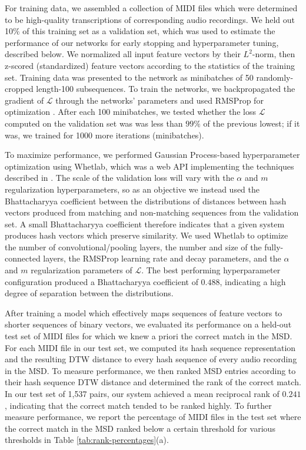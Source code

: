 \documentclass{article} %
\begin{document}
For training data, we assembled a collection of MIDI files which were determined to be high-quality transcriptions of corresponding audio recordings.
We held out 10\% of this training set as a validation set, which was used to estimate the performance of our networks for early stopping and hyperparameter tuning, described below.
We normalized all input feature vectors by their $L^2$-norm, then z-scored (standardized) feature vectors according to the statistics of the training set.
Training data was presented to the network as minibatches of 50 randomly-cropped length-100 subsequences.
To train the networks, we backpropagated the gradient of $\mathcal{L}$ through the networks' parameters and used RMSProp for optimization \cite{tieleman2012lecture}.
After each 100 minibatches, we tested whether the loss $\mathcal{L}$ computed on the validation set was was less than $99\%$ of the previous lowest; if it was, we trained for 1000 more iterations (minibatches).

To maximize performance, we performed Gaussian Process-based hyperparameter optimization using Whetlab, which was a web API implementing the techniques described in \cite{snoek2012practical}.
The scale of the validation loss will vary with the $\alpha$ and $m$ regularization hyperparameters, so as an objective we instead used the Bhattacharyya coefficient between the distributions of distances between hash vectors produced from matching and non-matching sequences from the validation set.
A small Bhattacharyya coefficient therefore indicates that a given system produces hash vectors which preserve similarity.
We used Whetlab to optimize the number of convolutional/pooling layers, the number and size of the fully-connected layers, the RMSProp learning rate and decay parameters, and the $\alpha$ and $m$ regularization parameters of $\mathcal{L}$.
The best performing hyperparameter configuration produced a Bhattacharyya coefficient of $0.488$, indicating a high degree of separation between the distributions.

After training a model which effectively maps sequences of feature vectors to shorter sequences of binary vectors, we evaluated its performance on a held-out test set of MIDI files for which we knew a priori the correct match in the MSD.
For each MIDI file in our test set, we computed its hash sequence representation and the resulting DTW distance to every hash sequence of every audio recording in the MSD.
To measure performance, we then ranked MSD entries according to their hash sequence DTW distance and determined the rank of the correct match.
In our test set of 1,537 pairs, our system achieved a mean reciprocal rank of $0.241$, indicating that the correct match tended to be ranked highly.
To further measure performance, we report the percentage of MIDI files in the test set where the correct match in the MSD ranked below a certain threshold for various thresholds in Table \ref{tab:rank-percentages}(a).
\end{document}
